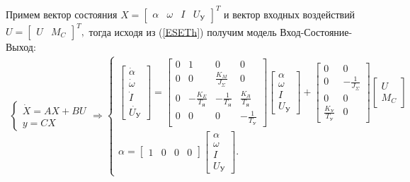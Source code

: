 \documentclass[fleqn, a4paper, 11pt, russian]{article}
\begin{document}
	Примем вектор состояния
	$
		X =
		\begin{bmatrix}
			\alpha & \omega & I & U_\text{У}
		\end{bmatrix}^T
	$
	и вектор входных воздействий
	$
		U =
		\begin{bmatrix}
			U & M_C
		\end{bmatrix}^T,
	$
	тогда исходя из (\ref{ESETh}) получим модель Вход-Состояние-Выход:
	\begin{align}
		\begin{cases}
			\dot{X} = AX + BU\\
			y = CX
		\end{cases} \Rightarrow
		\begin{cases}
			\begin{bmatrix}
				\dot{\alpha}\\
				\dot{\omega}\\
				\dot{I}\\
				\dot{U_\text{У}}
			\end{bmatrix} =
			\begin{bmatrix}
				0 & 1 & 0 & 0\\
				0 & 0 & \displaystyle{\frac{K_M}{J_\Sigma}} & 0\\
				0 & -\displaystyle{\frac{K_E}{T_\text{Я}}} & -\displaystyle{\frac{1}{T_\text{Я}}} & \displaystyle{\frac{K_\text{Д}}{T_\text{Я}}}\\
				0 & 0 & 0 & -\displaystyle{\frac{1}{T_\text{У}}}
			\end{bmatrix}
			\begin{bmatrix}
				\alpha\\
				\omega\\
				I\\
				U_\text{У}
			\end{bmatrix}
			+
			\begin{bmatrix}
				0 & 0\\
				0 & -\displaystyle{\frac{1}{J_\Sigma}}\\
				0 & 0\\
				\displaystyle{\frac{K_\text{У}}{T_\text{У}}} & 0
			\end{bmatrix}
			\begin{bmatrix}
				U\\
				M_C
			\end{bmatrix}\\
			\alpha = 
			\begin{bmatrix}
				1 & 0 & 0 & 0
			\end{bmatrix}
			\begin{bmatrix}
				\alpha\\
				\omega\\
				I\\
				U_\text{У}
			\end{bmatrix}.
		\end{cases}
		\label{ESEFull}
	\end{align}
	
\end{document}
